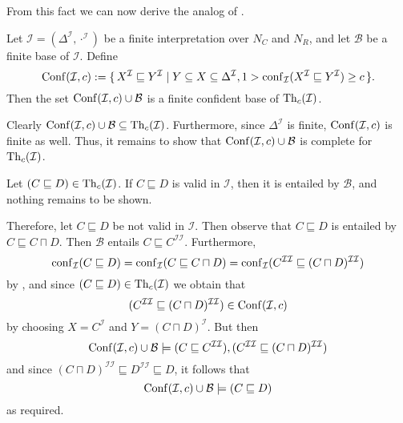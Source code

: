From this fact we can now derive the analog of .

\begin{Theorem}
  \label{thm:conf-base}
  Let $\mathcal{I} = (\Delta^{\mathcal{I}}, \cdot^{\mathcal{I}})$ be a finite
  interpretation over $N_C$ and $N_R$, and let $\mathcal{B}$ be a finite base of
  $\mathcal{I}$.  Define
  \begin{equation*}
    \operatorname{Conf}(\mathcal{I}, c) := {\{\, X^{\mathcal{I}} \sqsubseteq Y^{\mathcal{I}} \mid Y
      \subseteq X \subseteq \Delta^{\mathcal{I}}, 1 > \operatorname{conf}_{\mathcal{I}}( X^{\mathcal{I}}
      \sqsubseteq Y^{\mathcal{I}} ) \ge c \,\}}.
  \end{equation*}
  Then the set $\operatorname{Conf}(\mathcal{I}, c) \cup \mathcal{B}$ is a finite confident base of
  $\operatorname{Th}_c(\mathcal{I})$.
\end{Theorem}
\begin{Proof}
  Clearly $\operatorname{Conf}(\mathcal{I}, c) \cup \mathcal{B} \subseteq \operatorname{Th}_c(\mathcal{I})$.
  Furthermore, since $\Delta^{\mathcal{I}}$ is finite, $\operatorname{Conf}(\mathcal{I}, c)$ is finite
  as well.  Thus, it remains to show that $\operatorname{Conf}(\mathcal{I}, c) \cup \mathcal{B}$ is
  complete for $\operatorname{Th}_c(\mathcal{I})$.

  Let $(C \sqsubseteq D) \in \operatorname{Th}_c(\mathcal{I})$.  If $C \sqsubseteq D$ is valid in
  $\mathcal{I}$, then it is entailed by $\mathcal{B}$, and nothing remains to be shown.

  Therefore, let $C \sqsubseteq D$ be not valid in $\mathcal{I}$.  Then observe that $C
  \sqsubseteq D$ is entailed by $C \sqsubseteq C \sqcap D$.  Then $\mathcal{B}$ entails $C
  \sqsubseteq C^{\mathcal{I}\mathcal{I}}$.  Furthermore,
  \begin{equation*}
    \operatorname{conf}_{\mathcal{I}}( C \sqsubseteq D ) = \operatorname{conf}_{\mathcal{I}}( C \sqsubseteq C \sqcap D
    ) = \operatorname{conf}_{\mathcal{I}}( C^{\mathcal{I}\mathcal{I}} \sqsubseteq (C \sqcap
    D)^{\mathcal{I}\mathcal{I}} )
  \end{equation*}
  by , and since $(C \sqsubseteq D) \in
  \operatorname{Th}_c(\mathcal{I})$ we obtain that
  \begin{equation*}
    (C^{\mathcal{I}\mathcal{I}} \sqsubseteq (C \sqcap D)^{\mathcal{I}\mathcal{I}}) \in
    \operatorname{Conf}(\mathcal{I}, c)
  \end{equation*}
  by choosing $X = C^{\mathcal{I}}$ and $Y = (C \sqcap D)^{\mathcal{I}}$.  But then
  \begin{equation*}
    \operatorname{Conf}(\mathcal{I}, c) \cup \mathcal{B} \models (C \sqsubseteq
    C^{\mathcal{I}\mathcal{I}}), (C^{\mathcal{I}\mathcal{I}} \sqsubseteq (C \sqcap
    D)^{\mathcal{I}\mathcal{I}})
  \end{equation*}
  and since $(C \sqcap D)^{\mathcal{I}\mathcal{I}} \sqsubseteq D^{\mathcal{I}\mathcal{I}}
  \sqsubseteq D$, it follows that
  \begin{equation*}
    \operatorname{Conf}(\mathcal{I}, c) \cup \mathcal{B} \models (C \sqsubseteq D)
  \end{equation*}
  as required.
\end{Proof}

